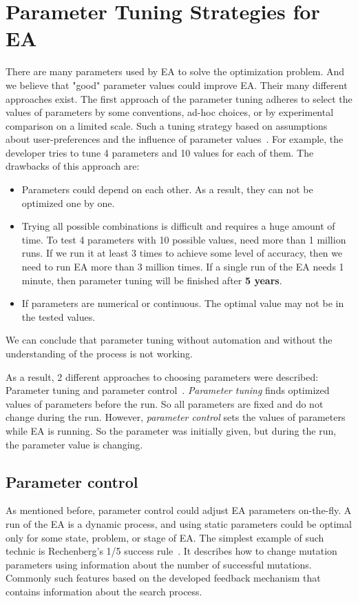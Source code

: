 \section{Parameter Tuning Strategies for EA}\label{sec:Parameter Tuning Strategies}

There are many parameters used by EA to solve the optimization problem. And we believe that "good" parameter values could improve EA. Their many different approaches exist. 
The first approach of the parameter tuning adheres to select the values of parameters by some conventions, ad-hoc choices, or by experimental comparison on a limited scale. Such a tuning strategy based on assumptions about user-preferences and the influence of parameter values~\cite{eiben03,eiben11}. For example, the developer tries to tune 4 parameters and 10 values for each of them.
The drawbacks of this approach are:
\begin{itemize}
	\item Parameters could depend on each other. As a result, they can not be optimized one by one.
	\item Trying all possible combinations is difficult and requires a huge amount of time. To test 4 parameters with 10 possible values, need more than 1 million runs. If we run it at least 3 times to achieve some level of accuracy, then we need to run EA more than 3 million times. If a single run of the EA needs 1 minute, then parameter tuning will be finished after \textbf{5 years}. 
	\item If parameters are numerical or continuous. The optimal value may not be in the tested values.
\end{itemize}

We can conclude that parameter tuning without automation and without the understanding of the process is not working.

As a result, 2 different approaches to choosing parameters were described: Parameter tuning and parameter control~\cite{smit2012parameter,eiben03}.
\textit{Parameter tuning} finds optimized values of parameters before the run. So all parameters are fixed and do not change during the run. However, \textit{parameter control} sets the values of parameters while EA is running. So the parameter was initially given, but during the run, the parameter value is changing. 

\subsection{Parameter control}
As mentioned before, parameter control could adjust EA parameters on-the-fly. A run of the EA is a dynamic process, and using static parameters could be optimal only for some state, problem, or stage of EA. 
The simplest example of such technic is Rechenberg's 1/5 success rule~\cite{rechenberg1973evolutionsstrategie}. It describes how to change mutation parameters using information about the number of successful mutations. Commonly such features based on the developed feedback mechanism that contains information about the search process.

